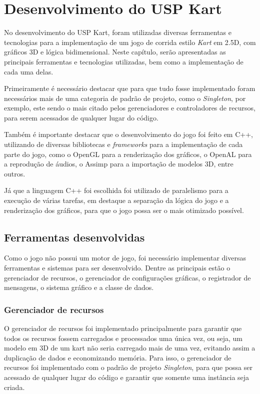 \chapter{Desenvolvimento do USP Kart}

No desenvolvimento do USP Kart, foram utilizadas diversas ferramentas e tecnologias para a implementação de um jogo de corrida estilo \textit{Kart} em 2.5D, com gráficos 3D e lógica bidimensional. Neste capítulo, serão apresentadas as principais ferramentas e tecnologias utilizadas, bem como a implementação de cada uma delas.

Primeiramente é necessário destacar que para que tudo fosse implementado foram necessários mais de uma categoria de padrão de projeto, como o \textit{Singleton}, por exemplo, este sendo o mais citado pelos gerenciadores e controladores de recursos, para serem acessados de qualquer lugar do código.

Também é importante destacar que o desenvolvimento do jogo foi feito em C++, utilizando de diversas bibliotecas e \textit{frameworks} para a implementação de cada parte do jogo, como o OpenGL para a renderização dos gráficos, o OpenAL para a reprodução de áudios, o Assimp para a importação de modelos 3D, entre outros.

Já que a linguagem C++ foi escolhida foi utilizado de paralelismo para a execução de várias tarefas, em destaque a separação da lógica do jogo e a renderização dos gráficos, para que o jogo possa ser o mais otimizado possível.

\section{Ferramentas desenvolvidas}

Como o jogo não possui um motor de jogo, foi necessário implementar diversas ferramentas e sistemas para ser desenvolvido. Dentre as principais estão o gerenciador de recursos, o gerenciador de configurações gráficas, o registrador de mensagens, o sistema gráfico e a classe de dados.

\subsection{Gerenciador de recursos}

O gerenciador de recursos foi implementado principalmente para garantir que todos os recursos fossem carregados e processados uma única vez, ou seja, um modelo em 3D de um kart não seria carregado mais de uma vez, evitando assim a duplicação de dados e economizando memória. Para isso, o gerenciador de recursos foi implementado com o padrão de projeto \textit{Singleton}, para que possa ser acessado de qualquer lugar do código e garantir que somente uma instância seja criada.

